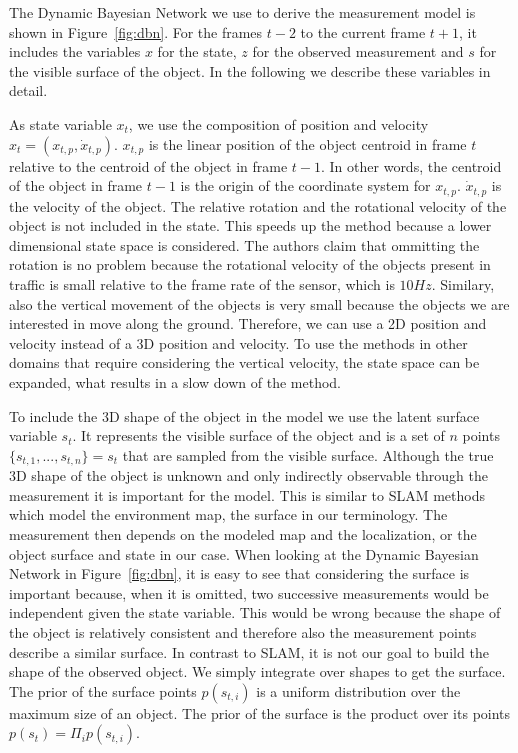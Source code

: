 \documentclass[twoside,a4paper,article]{combine}
\begin{document}
The Dynamic Bayesian Network we use to derive the measurement model is
shown in Figure~\ref{fig:dbn}. For the frames $t-2$ to the current
frame $t+1$, it includes the variables $x$ for the state, $z$ for the
observed measurement and $s$ for the visible surface of the object. In
the following we describe these variables in detail.

As state variable $x_t$, we use the composition of position and
velocity $x_t=(x_{t,p},\dot{x}_{t,p})$. $x_{t,p}$ is the linear
position of the object centroid in frame $t$ relative to the centroid
of the object in frame $t-1$. In other words, the centroid of the
object in frame $t-1$ is the origin of the coordinate system for
$x_{t,p}$. $\dot{x}_{t,p}$ is the velocity of the object. The relative
rotation and the rotational velocity of the object is not included in
the state. This speeds up the method because a lower dimensional state
space is considered. The authors claim that ommitting the rotation is
no problem because the rotational velocity of the objects present in
traffic is small relative to the frame rate of the sensor, which is
$10Hz$. Similary, also the vertical movement of the objects is very
small because the objects we are interested in move along the
ground. Therefore, we can use a 2D position and velocity instead of a
3D position and velocity. To use the methods in other domains that
require considering the vertical velocity, the state space can be
expanded, what results in a slow down of the method.

To include the 3D shape of the object in the model we use the latent
surface variable $s_t$. It represents the visible surface of the
object and is a set of $n$ points $\{s_{t,1}, ..., s_{t,n}\} = s_t$
that are sampled from the visible surface. Although the true 3D shape
of the object is unknown and only indirectly observable through the
measurement it is important for the model. This is similar to SLAM
methods which model the environment map, the surface in our
terminology. The measurement then depends on the modeled map and the
localization, or the object surface and state in our case. When
looking at the Dynamic Bayesian Network in Figure~\ref{fig:dbn}, it is
easy to see that considering the surface is important because, when it
is omitted, two successive measurements would be independent given the
state variable. This would be wrong because the shape of the object is
relatively consistent and therefore also the measurement points
describe a similar surface. In contrast to SLAM, it is not our goal to
build the shape of the observed object. We simply integrate over
shapes to get the surface. The prior of the surface points
$p(s_{t,i})$ is a uniform distribution over the maximum size of an
object. The prior of the surface is the product over its points
$p(s_{t})=\Pi_i p(s_{t,i})$.
\end{document}
